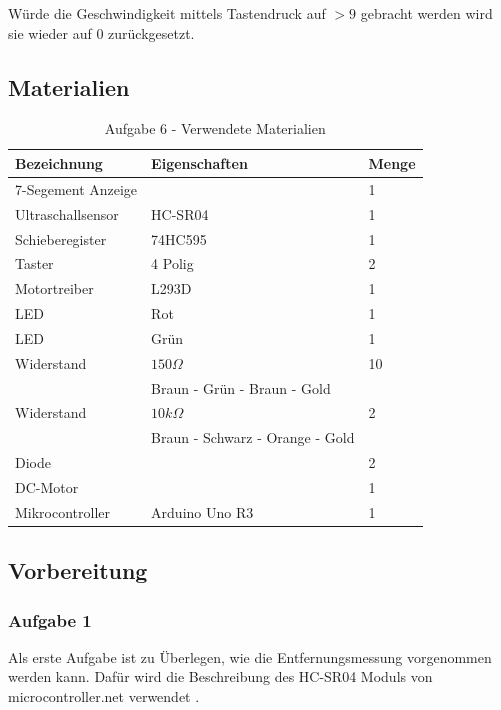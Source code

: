 Würde die Geschwindigkeit mittels Tastendruck auf $> 9$ gebracht werden wird sie wieder auf 0 zurückgesetzt.

\subsection{Materialien}
\label{subsec:a6-materialien}

\begin{table}[h]
    \centering
    \caption{Aufgabe 6 - Verwendete Materialien}
    \label{tab:a6-materialien}
    \begin{tabular}{| l | l | l |}
        \hline
        Bezeichnung & Eigenschaften & Menge \\
        \hline
        7-Segement Anzeige & & 1 \\
        Ultraschallsensor & HC-SR04 & 1 \\
        Schieberegister & 74HC595 & 1 \\
        Taster & 4 Polig & 2\\
        Motortreiber & L293D & 1 \\
        LED & Rot & 1 \\
        LED & Grün & 1 \\
        Widerstand & $150\Omega$ & 10 \\
        & Braun - Grün - Braun - Gold & \\
        Widerstand & $10k\Omega$ & 2 \\
        & Braun - Schwarz - Orange - Gold & \\
        Diode & & 2 \\
        DC-Motor & & 1 \\
        Mikrocontroller & Arduino Uno R3 & 1 \\
        \hline
    \end{tabular}
\end{table}

\subsection{Vorbereitung}
\label{subsec:a6-vorbereitung}

\subsubsection{Aufgabe 1}
Als erste Aufgabe ist zu Überlegen, wie die Entfernungsmessung vorgenommen werden kann.
Dafür wird die Beschreibung des HC-SR04 Moduls von microcontroller.net verwendet \cite{ultraschallsensor}.

